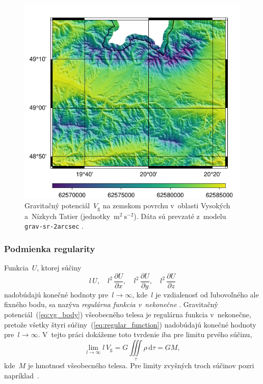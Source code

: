 \documentclass[a4paper,12pt]{book}
\newcommand{\diff}{\mathrm d}
\newcommand{\gidx}{\mathrm g}
\begin{document}
\begin{figure}
\centering
\includegraphics{./fig-vg-grav-sr-2arcsec.pdf}
\caption{Gravitačný potenciál~$V_\gidx$ na zemskom povrchu v~oblasti Vysokých
a~Nízkych Tatier (jednotky~$\mathrm{m}^2 \ \mathrm{s}^{-2}$).  Dáta sú prevzaté
z~modelu \texttt{grav-sr-2arcsec} \parencite{GravSR2arcsec}.}
\label{fig:vg_grav_sr_2arcsec}
\end{figure}

\subsubsection{Podmienka regularity}

Funkcia~$U$, ktorej súčiny
%
\begin{equation}
\label{eq:regular_function}
l \, U{,} \quad l^2 \, \frac{\partial U}{\partial x}{,} \quad l^2 \, 
\frac{\partial U}{\partial y}{,} \quad l^2 \, \frac{\partial U}{\partial z}
\end{equation}
%
nadobúdajú konečné hodnoty pre~$l \rightarrow \infty$, kde~$l$ je vzdialenosť 
od ľubovoľného ale fixného bodu, sa nazýva \emph{regulárna funkcia v~nekonečne} 
\parencite{Kellogg1967,Pick1973}.  Gravitačný potenciál~(\ref{eq:vg_body}) 
všeobecného telesa je regulárna funkcia v~nekonečne, pretože všetky štyri 
súčiny~(\ref{eq:regular_function}) nadobúdajú konečné hodnoty pre~$l 
\rightarrow \infty$.  V~tejto práci dokážeme toto tvrdenie iba pre limitu 
prvého súčinu,
%
\begin{equation}
\label{eq:vg_regular}
\lim_{l \rightarrow \infty} l \, V_\gidx = G \iiint\limits_{\tau} \rho \, 
\diff\tau = GM{,}
\end{equation}
%
kde~$M$ je hmotnosť všeobecného telesa.  Pre limity zvyšných troch súčinov 
pozri napríklad~\textcite{Pick1973}.
\end{document}
